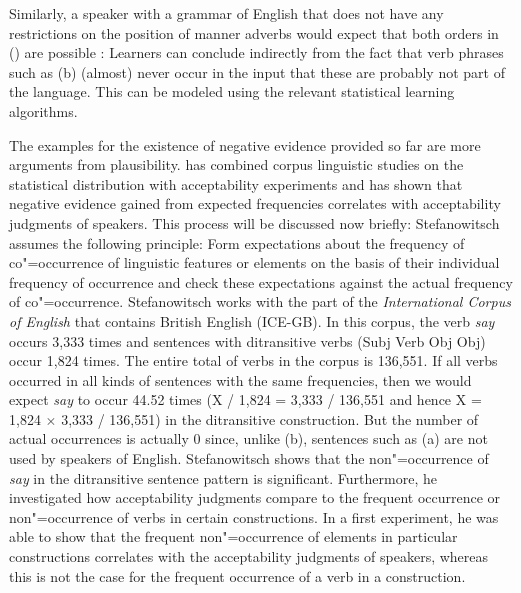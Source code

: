 Similarly, a speaker with a grammar of English that does not have any restrictions on
the position of manner adverbs would expect that both orders in () are possible \citep[]{SP2002b}:
\eal
{}
\zl
Learners can conclude indirectly from the fact that verb phrases such as (b) (almost) never occur in the input that these are probably not part
of the language. This can be modeled using the relevant statistical learning algorithms.

The examples for the existence of negative evidence provided so far are more arguments from plausibility.
\citet{Stefanowitsch2008a} has combined corpus linguistic studies
on the statistical distribution with acceptability experiments and has shown that negative evidence gained from
expected frequencies correlates with acceptability judgments of speakers. This process will be discussed now briefly: Stefanowitsch
assumes the following principle:
\ea
Form expectations about the frequency of co"=occurrence of linguistic features or elements on the basis of their individual frequency of occurrence
and check these expectations against the actual frequency of co"=occurrence. \citep[]{Stefanowitsch2008a}
\z
Stefanowitsch works with the part of the \emph{International Corpus of English} that contains British English (ICE-GB). In this corpus, the
verb \emph{say} occurs 3,333 times and sentences with ditransitive verbs (Subj Verb Obj Obj) occur 1,824 times. The entire total of verbs in the corpus
is 136,551. If all verbs occurred in all kinds of sentences with the same frequencies, then we would expect \emph{say} to occur 44.52 times
(X / 1,824 = 3,333 / 136,551 and hence X = 1,824 $\times$ 3,333 / 136,551) in the ditransitive construction. But the number of actual
occurrences is actually 0 since, unlike (b), sentences such as (a) are not used by
speakers of English. 
\eal
{}
\zl
Stefanowitsch shows that the non"=occurrence of \emph{say} in the ditransitive sentence pattern is significant. Furthermore, he investigated how acceptability
judgments compare to the frequent occurrence or non"=occurrence of verbs in certain constructions. 
In a first experiment, he was able to show that the frequent non"=occurrence of elements in particular constructions correlates with the acceptability judgments of speakers, whereas
this is not the case for the frequent occurrence of a verb in a construction.

